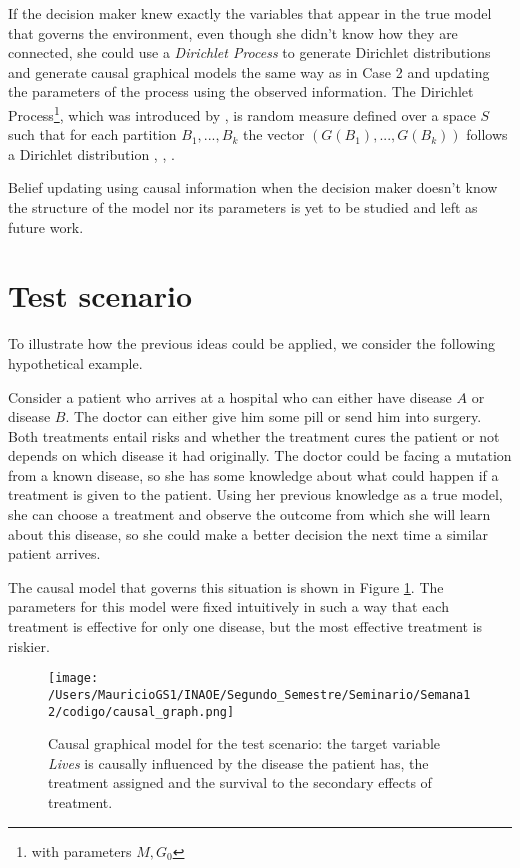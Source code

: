 \documentclass{article}
\begin{document}
If the decision maker knew exactly the variables that appear in the true model that governs the environment, even though she didn't know how they are connected, she could use a \textit{Dirichlet Process} to generate Dirichlet distributions and generate causal graphical models the same way as in Case 2 and updating the parameters of the process using the observed information. The Dirichlet Process\footnote{with parameters $M,G_0$}, which was introduced by \cite{ferguson1973bayesian}, is random measure defined over a space $S$ such that for each partition $B_1,...,B_k$ the vector $(G(B_1),...,G(B_k))$ follows a Dirichlet distribution \cite{hjort2010bayesian}, \cite{muller2016bayesian}, \cite{ghosal2017fundamentals}. 

Belief updating using causal information when the decision maker doesn't know the structure of the model nor its parameters is yet to be studied and left as future work. 

\section{Test scenario}
To illustrate how the previous ideas could be applied, we consider the following hypothetical example.

Consider a patient who arrives at a hospital who can either have disease $A$ or disease $B$. The doctor can either give him some pill or send him into surgery.  Both treatments entail risks and whether the treatment cures the patient or not depends on which disease it had originally. The doctor could be facing a mutation from a known disease, so she has some knowledge about what could happen if a treatment is given to the patient. Using her previous knowledge as a true model, she can choose a treatment and observe the outcome from which she will learn about this disease, so she could make a better decision the next time a similar patient arrives.

The causal model that governs this situation is shown in Figure \ref{causal_model}. The parameters for this model were fixed intuitively in such a way that each treatment is effective for only one disease, but the most effective treatment is riskier.

\begin{figure}[ht]
\vskip 0.2in
\begin{center}
\centerline{\texttt{[image: /Users/MauricioGS1/INAOE/Segundo\_Semestre/Seminario/Semana12/codigo/causal\_graph.png]}}
\caption{Causal graphical model for the test scenario: the target variable \textit{Lives} is causally influenced by the disease the patient has, the treatment assigned and the survival to the secondary effects of treatment.}
\label{causal_model}
\end{center}
\vskip -0.2in
\end{figure}
\end{document}
